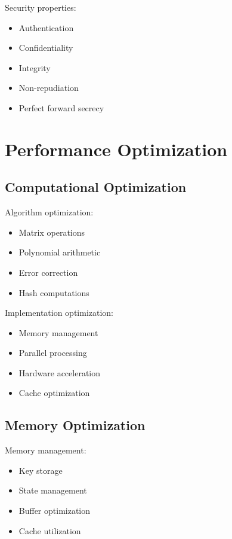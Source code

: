 \documentclass[12pt]{article}
\begin{document}
Security properties:

\begin{itemize}
\item Authentication
\item Confidentiality
\item Integrity
\item Non-repudiation
\item Perfect forward secrecy
\end{itemize}

\section{Performance Optimization}

\subsection{Computational Optimization}

Algorithm optimization:

\begin{itemize}
\item Matrix operations
\item Polynomial arithmetic
\item Error correction
\item Hash computations
\end{itemize}

Implementation optimization:

\begin{itemize}
\item Memory management
\item Parallel processing
\item Hardware acceleration
\item Cache optimization
\end{itemize}

\subsection{Memory Optimization}

Memory management:

\begin{itemize}
\item Key storage
\item State management
\item Buffer optimization
\item Cache utilization
\end{itemize}
\end{document}
